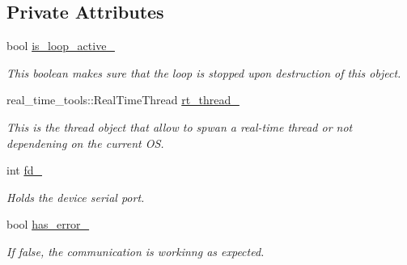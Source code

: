 \subsection*{Private Attributes}
\begin{DoxyCompactItemize}
\item 
\mbox{\label{classblmc__drivers_1_1SerialReader_a37e1129c27b41cd9f5b4317081b217d8}} 
bool \hyperlink{classblmc__drivers_1_1SerialReader_a37e1129c27b41cd9f5b4317081b217d8}{is\+\_\+loop\+\_\+active\+\_\+}
\begin{DoxyCompactList}\small\item\em This boolean makes sure that the loop is stopped upon destruction of this object. \end{DoxyCompactList}\item 
\mbox{\label{classblmc__drivers_1_1SerialReader_a89a2a93d8a9e59738f41d8b69cb112d0}} 
real\+\_\+time\+\_\+tools\+::\+Real\+Time\+Thread \hyperlink{classblmc__drivers_1_1SerialReader_a89a2a93d8a9e59738f41d8b69cb112d0}{rt\+\_\+thread\+\_\+}
\begin{DoxyCompactList}\small\item\em This is the thread object that allow to spwan a real-\/time thread or not dependening on the current OS. \end{DoxyCompactList}\item 
\mbox{\label{classblmc__drivers_1_1SerialReader_abf30ca34b8f61706a763a431dff68e94}} 
int \hyperlink{classblmc__drivers_1_1SerialReader_abf30ca34b8f61706a763a431dff68e94}{fd\+\_\+}
\begin{DoxyCompactList}\small\item\em Holds the device serial port. \end{DoxyCompactList}\item 
\mbox{\label{classblmc__drivers_1_1SerialReader_abb0700e8e752917876798db18a0421db}} 
bool \hyperlink{classblmc__drivers_1_1SerialReader_abb0700e8e752917876798db18a0421db}{has\+\_\+error\+\_\+}
\begin{DoxyCompactList}\small\item\em If false, the communication is workinng as expected. \end{DoxyCompactList}\item 

\end{DoxyCompactItemize}
